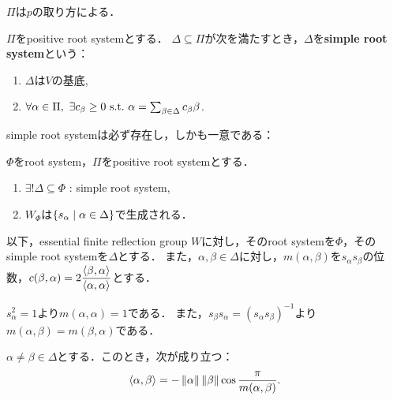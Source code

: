 \begin{rem}
  $\Pi$は$p$の取り方による．
\end{rem}

\begin{defi}
  $\Pi$をpositive root systemとする．
  $\Delta \subseteq \Pi$が次を満たすとき，$\Delta$を\textbf{simple root system}という：
  \begin{enumerate}[label=(\roman*)]
    \item $\Delta$は$V$の基底,
    \item $\forall \alpha \in \Pi,\ \exists c_\beta \ge 0 \ \text{s.t.}\  \alpha = \sum_{\beta \in \Delta} c_\beta \beta$.
  \end{enumerate}
\end{defi}

simple root systemは必ず存在し，しかも一意である：

\begin{fact}
  $\Phi$をroot system，$\Pi$をpositive root systemとする．
  \begin{enumerate}[label=(\arabic*)]
    \item $\exists! \Delta \subseteq \Phi$ : simple root system,
    \item $W_\Phi$は$\left\lbrace s_\alpha \mathrel{} \middle| \mathrel{} \alpha \in \Delta \right\rbrace$で生成される．
  \end{enumerate}
\end{fact}

以下，essential finite reflection group $W$に対し，そのroot systemを$\Phi$，そのsimple root systemを$\Delta$とする．
また，$\alpha, \beta \in \Delta$に対し，$m(\alpha, \beta)$を$s_\alpha s_\beta$の位数，$c(\beta, \alpha) = 2\dfrac{\left\langle \beta, \alpha \right\rangle}{\left\langle \alpha, \alpha \right\rangle}$とする．

\begin{rem}
  $s_\alpha^2 = 1$より$m(\alpha, \alpha) = 1$である．
  また，$s_\beta s_\alpha = (s_\alpha s_\beta)^{-1}$より$m(\alpha, \beta) = m(\beta, \alpha)$である．
\end{rem}

\begin{lem} \label{lem:inner_order}
  $\alpha \ne \beta \in \Delta$とする．このとき，次が成り立つ：
  \begin{equation}
    \left\langle \alpha, \beta \right\rangle
    = -\left\| \alpha \right\| \left\| \beta \right\| \cos\frac{\pi}{m(\alpha, \beta)}.
  \end{equation}
\end{lem}

